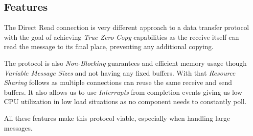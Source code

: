 \subsection{Features}

The Direct Read connection is very different approach to a data transfer protocol with the goal of achieving 
\emph{True Zero Copy} capabilities as the receive itself can read the message to its final place, preventing any additional 
copying. 

The protocol is also \emph{Non-Blocking} guarantees and efficient memory usage though \emph{Variable Message Sizes} and not 
having any fixed buffers. With that \emph{Resource Sharing} follows as multiple connections can reuse the same receive and 
send buffers. It also allows us to use \emph{Interrupts} from completion events
giving us low CPU utilization in low load situations as no component needs to constantly poll.

All these features make this protocol viable, especially when handling large messages.
